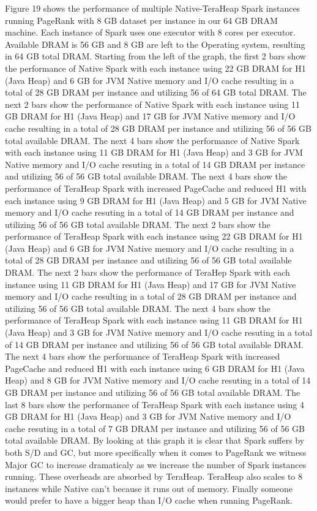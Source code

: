 \documentclass[twocolumn,10pt]{asme2e}
\begin{document}
Figure 19 shows the performance of multiple Native-TeraHeap Spark instances running PageRank with 8 GB dataset per instance in our 64 GB DRAM machine. Each instance of Spark uses one executor with 8 cores per executor. Available DRAM is 56 GB and 8 GB are left to the Operating system, resulting in 64 GB total DRAM. Starting from the left of the graph, the first 2 bars show the performance of Native Spark with each instance using 22 GB DRAM for H1 (Java Heap) and 6 GB for JVM Native memory and I/O cache resulting in a total of 28 GB DRAM per instance and utilizing 56 of 64 GB total DRAM. The next 2 bars show the performance of Native Spark with each instance using 11 GB DRAM for H1 (Java Heap) and 17 GB for JVM Native memory and I/O cache resulting in a total of 28 GB DRAM per instance and utilizing 56 of 56 GB total available DRAM. The next 4 bars show the performance of Native Spark with each instance using 11 GB DRAM for H1 (Java Heap) and 3 GB for JVM Native memory and I/O cache resuting in a total of 14 GB DRAM per instance and utilizing 56 of 56 GB total available DRAM. The next 4 bars show the performance of TeraHeap Spark with increased PageCache and reduced H1 with each instance using 9 GB DRAM for H1 (Java Heap) and 5 GB for JVM Native memory and I/O cache resuting in a total of 14 GB DRAM per instance and utilizing 56 of 56 GB total available DRAM. 
The next 2 bars show the performance of TeraHeap Spark with each instance using 22 GB DRAM for H1 (Java Heap) and 6 GB for JVM Native memory and I/O cache resulting in a total of 28 GB DRAM per instance and utilizing 56 of 56 GB total available DRAM. The next 2 bars show the performance of TeraHep Spark with each instance using 11 GB DRAM for H1 (Java Heap) and 17 GB for JVM Native memory and I/O cache resulting in a total of 28 GB DRAM per instance and utilizing 56 of 56 GB total available DRAM. The next 4 bars show the performance of TeraHeap Spark with each instance using 11 GB DRAM for H1 (Java Heap) and 3 GB for JVM Native memory and I/O cache resuting in a total of 14 GB DRAM per instance and utilizing 56 of 56 GB total available DRAM. The next 4 bars show the performance of TeraHeap Spark with increased PageCache and reduced H1 with each instance using 6 GB DRAM for H1 (Java Heap) and 8 GB for JVM Native memory and I/O cache resuting in a total of 14 GB DRAM per instance and utilizing 56 of 56 GB total available DRAM. The last 8 bars show the performance of TeraHeap Spark with each instance using 4 GB DRAM for H1 (Java Heap) and 3 GB for JVM Native memory and I/O cache resuting in a total of 7 GB DRAM per instance and utilizing 56 of 56 GB total available DRAM.  
By looking at this graph it is clear that Spark suffers by both S/D and GC, but more specifically when it comes to PageRank we witness Major GC to increase dramaticaly as we increase the number of Spark instances running. These overheads are absorbed by TeraHeap. TeraHeap also scales to 8 instances while Native can't because it runs out of memory. Finally someone would prefer to have a bigger heap than I/O cache when running PageRank.
\end{document}
